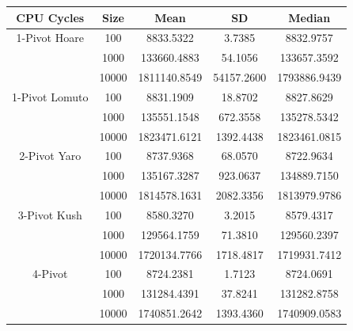 \documentclass{article}
\begin{document}
\begin{center}
    \begin{tabular}{ |c c | c c c| }
        \hline
        CPU Cycles      & Size     & Mean         & SD          & Median \\
        \hline
        1-Pivot Hoare   & 100      & 8833.5322    & 3.7385      & 8832.9757 \\
                        & 1000     & 133660.4883  & 54.1056     & 133657.3592 \\
                        & 10000    & 1811140.8549 & 54157.2600  & 1793886.9439 \\
        \hline
        1-Pivot Lomuto  & 100      & 8831.1909    & 18.8702     & 8827.8629 \\
                        & 1000     & 135551.1548  & 672.3558    & 135278.5342 \\
                        & 10000    & 1823471.6121 & 1392.4438   & 1823461.0815 \\
        \hline
        2-Pivot Yaro    & 100      & 8737.9368    & 68.0570     & 8722.9634 \\
                        & 1000     & 135167.3287  &	923.0637    & 134889.7150 \\
                        & 10000    & 1814578.1631 & 2082.3356   & 1813979.9786 \\
        \hline
        3-Pivot Kush    & 100      & 8580.3270    & 3.2015      & 8579.4317 \\
                        & 1000     & 129564.1759  &	71.3810     & 129560.2397 \\
                        & 10000    & 1720134.7766 & 1718.4817   & 1719931.7412 \\
        \hline
        4-Pivot         & 100      & 8724.2381    &	1.7123      & 8724.0691 \\
                        & 1000     & 131284.4391  &	37.8241     & 131282.8758 \\
                        & 10000    & 1740851.2642 & 1393.4360   & 1740909.0583 \\
        \hline
    \end{tabular}
\end{center}
\end{document}
